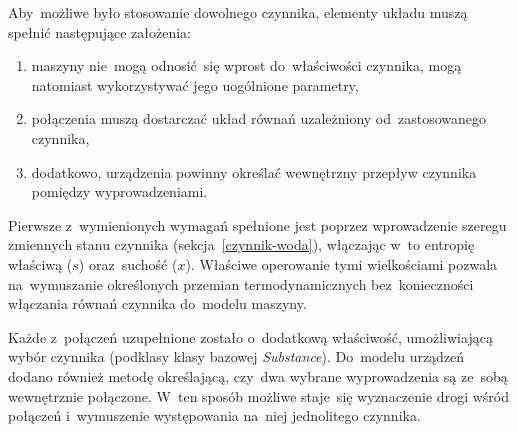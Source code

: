 Aby~możliwe było stosowanie dowolnego czynnika, elementy układu muszą
spełnić następujące założenia:

\begin{enumerate}

	\item maszyny nie~mogą odnosić~się wprost do~właściwości czynnika,
		mogą natomiast wykorzystywać jego uogólnione parametry,

	\item połączenia muszą dostarczać układ równań uzależniony
		od~zastosowanego czynnika,

	\item dodatkowo, urządzenia powinny określać wewnętrzny przepływ
		czynnika pomiędzy wyprowadzeniami.

\end{enumerate}

Pierwsze z~wymienionych wymagań spełnione jest poprzez wprowadzenie
szeregu zmiennych stanu czynnika (sekcja~\ref{czynnik-woda}), włączając
w~to entropię właściwą ($s$) oraz~suchość ($x$). Właściwe operowanie
tymi wielkościami pozwala na~wymuszanie określonych przemian
termodynamicznych bez~konieczności włączania równań czynnika do~modelu
maszyny.

Każde z~połączeń uzupełnione zostało o~dodatkową właściwość,
umożliwiającą wybór czynnika (podklasy klasy bazowej
\textit{Substance}). Do~modelu urządzeń dodano również metodę
określającą, czy~dwa wybrane wyprowadzenia są ze~sobą wewnętrznie
połączone. W~ten sposób możliwe staje~się wyznaczenie drogi wśród
połączeń i~wymuszenie występowania na~niej jednolitego czynnika.
